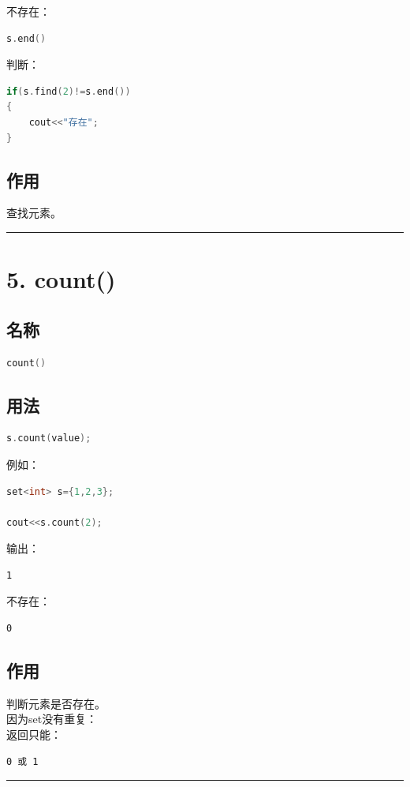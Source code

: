 \documentclass[10pt,twocolumn]{extarticle}
\begin{document}
不存在：
\begin{lstlisting}[language=C++]
s.end()
\end{lstlisting}
判断：
\begin{lstlisting}[language=C++]
if(s.find(2)!=s.end())
{
    cout<<"存在";
}
\end{lstlisting}

\subsection{作用}
查找元素。

\noindent\rule{\linewidth}{0.4pt}

\section{5. count()}

\subsection{名称}
\begin{lstlisting}[language=C++]
count()
\end{lstlisting}

\subsection{用法}
\begin{lstlisting}[language=C++]
s.count(value);
\end{lstlisting}
例如：
\begin{lstlisting}[language=C++]
set<int> s={1,2,3};

cout<<s.count(2);
\end{lstlisting}
输出：
\begin{lstlisting}
1
\end{lstlisting}
不存在：
\begin{lstlisting}
0
\end{lstlisting}

\subsection{作用}
判断元素是否存在。\\
因为set没有重复：\\
返回只能：
\begin{lstlisting}
0 或 1
\end{lstlisting}

\noindent\rule{\linewidth}{0.4pt}
\end{document}
